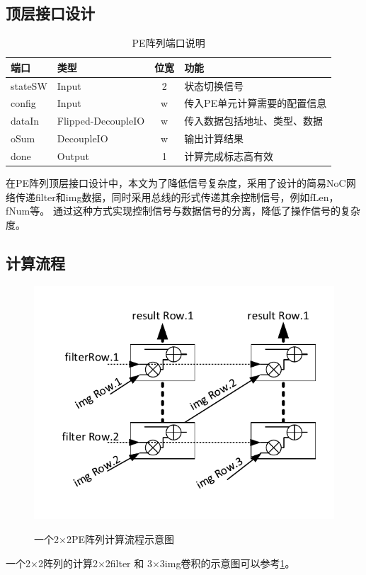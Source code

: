     \subsection{顶层接口设计}
\begin{table}[h] %
    \centering
    \caption{PE阵列端口说明} %
    \begin{tabular}{l|l|c|l} %
    \hline  
    \hline  
    端口 & 类型 & 位宽 & 功能 \\ %
    \hline %
    stateSW & Input & 2 & 状态切换信号 \\
    \hline  
    config & Input & w & 传入PE单元计算需要的配置信息 \\
    \hline  
    dataIn & Flipped-DecoupleIO & w & 传入数据包括地址、类型、数据 \\
    \hline  
    oSum & DecoupleIO & w & 输出计算结果 \\
    \hline  
    done & Output & 1 & 计算完成标志高有效 \\
    \hline  
    \hline  
    \end{tabular}  
\end{table}  
    在PE阵列顶层接口设计中，本文为了降低信号复杂度，采用了设计的简易NoC网络传递filter和img数据，同时采用总线的形式传递其余控制信号，例如fLen，fNum等。
    通过这种方式实现控制信号与数据信号的分离，降低了操作信号的复杂度。
    \subsection{计算流程}
\begin{figure}[h]
    \centering
    \includegraphics{../pdf/pearray_k.pdf}\\
    \caption{一个2×2PE阵列计算流程示意图}
    \label{pearray_k}
\end{figure}
一个2×2阵列的计算2×2filter 和 3×3img卷积的示意图可以参考\ref{pearray_k}。

